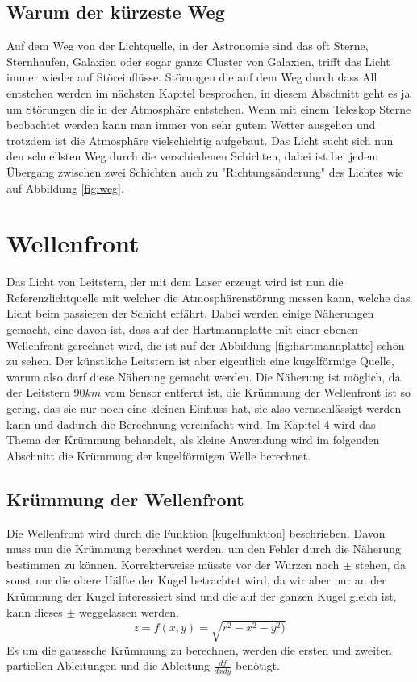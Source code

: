\begin{refsection}
\subsection{Warum der kürzeste Weg}
Auf dem Weg von der Lichtquelle, in der Astronomie sind das oft Sterne, Sternhaufen, Galaxien oder sogar ganze Cluster von Galaxien, trifft das Licht immer wieder auf Störeinflüsse. Störungen die auf dem Weg durch dass All entstehen werden im nächsten Kapitel besprochen, in diesem Abschnitt geht es ja um Störungen die in der Atmosphäre entstehen. Wenn mit einem Teleskop Sterne beobachtet werden kann man immer von sehr gutem Wetter ausgehen und trotzdem ist die Atmosphäre vielschichtig aufgebaut. Das Licht sucht sich nun den schnellsten Weg durch die verschiedenen Schichten, dabei ist bei jedem Übergang zwischen zwei Schichten auch zu "Richtungsänderung" des Lichtes wie auf Abbildung \ref{fig:weg}.

\section{Wellenfront}
Das Licht von Leitstern, der mit dem Laser erzeugt wird ist nun die Referenzlichtquelle mit welcher die Atmosphärenstörung messen kann, welche das Licht beim passieren der Schicht erfährt. Dabei werden einige Näherungen gemacht, eine davon ist, dass auf der Hartmannplatte mit einer ebenen Wellenfront gerechnet wird, die ist auf der Abbildung \ref{fig:hartmannplatte} schön zu sehen. Der künstliche Leitstern ist aber eigentlich eine kugelförmige Quelle, warum also darf diese Näherung gemacht werden. Die Näherung ist möglich, da der Leitstern 90$km$ vom Sensor entfernt ist, die Krümmung der Wellenfront ist so gering, das sie nur noch eine kleinen Einfluss hat, sie also vernachlässigt werden kann und dadurch die Berechnung vereinfacht wird. Im Kapitel 4 wird das Thema der Krümmung behandelt, als kleine Anwendung wird im folgenden Abschnitt die Krümmung der kugelförmigen Welle berechnet.

\subsection{Krümmung der Wellenfront}
Die Wellenfront wird durch die Funktion \eqref{kugelfunktion} beschrieben. Davon muss nun die Krümmung berechnet werden, um den Fehler durch die Näherung bestimmen zu können. Korrekterweise müsste vor der Wurzen noch $\pm$ stehen, da sonst nur die obere Hälfte der Kugel betrachtet wird, da wir aber nur an der Krümmung der Kugel interessiert sind und die auf der ganzen Kugel gleich ist, kann dieses $\pm$ weggelassen werden.
\begin{equation}\label{kugelfunktion}
z=f(x,y)=\sqrt{r^{2}-x^{2}-y^{2})}
\end{equation}
Es um die gausssche Krümmung zu berechnen, werden die ersten und zweiten partiellen Ableitungen und die Ableitung $ \frac{df}{dxdy}$ benötigt.


\end{refsection}
